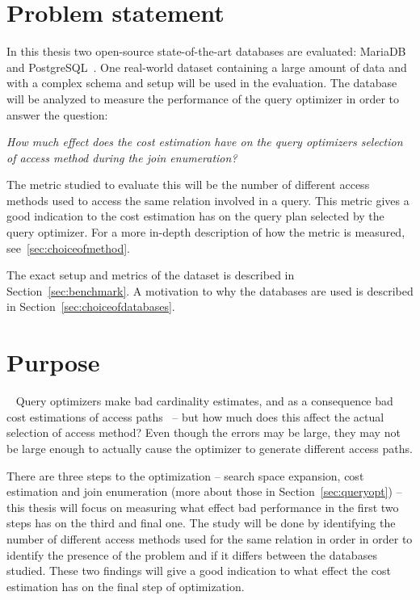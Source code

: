 \section{Problem statement}
In this thesis two open-source state-of-the-art databases are evaluated:
MariaDB~\cite{mariadb_m} and PostgreSQL~\cite{postgresql_ptwmaosd}. One
real-world dataset containing a large amount of data and with a complex schema
and setup will be used in the evaluation. The database will be analyzed to
measure the performance of the query optimizer in order to answer the question:

\textit{How much effect does the cost estimation have on the query optimizers
  selection of access method during the join enumeration?}

The metric studied to evaluate this will be the number of different access methods
used to access the same relation involved in a query. This metric gives a good
indication to the cost estimation has on the query plan selected by
the query optimizer. For a more in-depth description of how the metric is
measured, see~\ref{sec:choiceofmethod}.

The exact setup and metrics of the dataset is described in
Section~\ref{sec:benchmark}. A motivation to why the databases are used is
described in Section~\ref{sec:choiceofdatabases}.

\section{Purpose}~\label{sec:purpose}
Query optimizers make bad cardinality estimates, and as a consequence bad cost
estimations of access paths~\cite{leis_2015_how_hgaqor} – but how much does this
affect the actual selection of access method? Even though the errors may be large,
they may not be large enough to actually cause the optimizer to generate
different access paths.

There are three steps to the optimization – search space expansion, cost
estimation and join enumeration (more about those in Section~\ref{sec:queryopt})
– this thesis will focus on measuring what effect bad performance in the first
two steps has on the third and final one. The study will be done by identifying
the number of different access methods used for the same relation in order in
order to identify the presence of the problem and if it differs between the
databases studied. These two findings will give a good indication to what effect
the cost estimation has on the final step of optimization.

